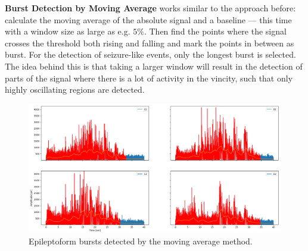 \documentclass[11pt, twocolumn]{article}
\begin{document}
    \textbf{Burst Detection by Moving Average} works similar to the approach before: calculate the moving average of the absolute signal and a baseline --- this time with a window size as large as e.g. $5\%$. Then find the points where the signal crosses the threshold both rising and falling and mark the points in between as burst. For the detection of seizure-like events, only the longest burst is selected.
    The idea behind this is that taking a larger window will result in the detection of parts of the signal where there is a lot of activity in the vincity, such that only highly oscillating regions are detected.
	\begin{figure}
     \begin{center}
      \includegraphics[keepaspectratio, width=\linewidth]{img/4_bursts_avg.png}
     \end{center}
		\caption{Epileptoform bursts detected by the moving average method. }
    \end{figure}
\end{document}
